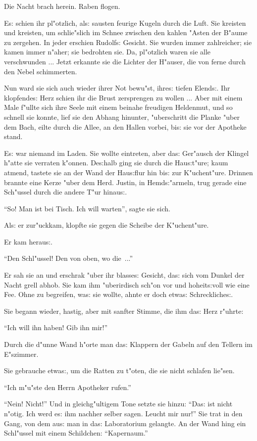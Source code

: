 \documentclass[oneside,12pt]{book}
\newcommand{\s}{s:}%
\begin{document}
Die Nacht brach herein. Raben flogen.

E{\s} schien ihr pl"otzlich, al{\s} sausten feurige Kugeln durch
die Luft. Sie kreisten und kreisten, um schlie"slich im Schnee
zwischen den kahlen "Asten der B"aume zu zergehen. In jeder
erschien Rudolf{\s} Gesicht. Sie wurden immer zahlreicher; sie
kamen immer n"aher; sie bedrohten sie. Da, pl"otzlich waren sie
alle verschwunden ... Jetzt erkannte sie die Lichter der H"auser,
die von ferne durch den Nebel schimmerten.

Nun ward sie sich auch wieder ihrer Not bewu"st, ihre{\s} tiefen
Elend{\s}. Ihr klopfende{\s} Herz schien ihr die Brust zersprengen
zu wollen ... Aber mit einem Male f"ullte sich ihre Seele mit
einem beinahe freudigen Heldenmut, und so schnell sie konnte, lief
sie den Abhang hinunter, "uberschritt die Planke "uber dem Bach,
eilte durch die Allee, an den Hallen vorbei, bi{\s} sie vor der
Apotheke stand.

E{\s} war niemand im Laden. Sie wollte eintreten, aber da{\s}
Ger"ausch der Klingel h"atte sie verraten k"onnen. De{\s}halb ging
sie durch die Hau{\s}t"ure; kaum atmend, tastete sie an der Wand
der Hau{\s}flur hin bi{\s} zur K"uchent"ure. Drinnen brannte eine
Kerze "uber dem Herd. Justin, in Hemd{\s}"armeln, trug gerade eine
Sch"ussel durch die andere T"ur hinau{\s}.

"`So! Man ist bei Tisch. Ich will warten"', sagte sie sich.

Al{\s} er zur"uckkam, klopfte sie gegen die Scheibe der
K"uchent"ure.

Er kam herau{\s}.

"`Den Schl"ussel! Den von oben, wo die~..."'

Er sah sie an und erschrak "uber ihr blasse{\s} Gesicht, da{\s}
sich vom Dunkel der Nacht grell abhob. Sie kam ihm "uberirdisch
sch"on vor und hoheit{\s}voll wie eine Fee. Ohne zu begreifen,
wa{\s} sie wollte, ahnte er doch etwa{\s} Schreckliche{\s}.

Sie begann wieder, hastig, aber mit sanfter Stimme, die ihm da{\s}
Herz r"uhrte:

"`Ich will ihn haben! Gib ihn mir!"'

Durch die d"unne Wand h"orte man da{\s} Klappern der Gabeln auf
den Tellern im E"szimmer.

Sie gebrauche etwa{\s}, um die Ratten zu t"oten, die sie nicht
schlafen lie"sen.

"`Ich m"u"ste den Herrn Apotheker rufen."'

"`Nein! Nicht!"' Und in gleichg"ultigem Tone setzte sie hinzu:
"`Da{\s} ist nicht n"otig. Ich werd e{\s} ihm nachher selber
sagen. Leucht mir nur!"' Sie trat in den Gang, von dem au{\s} man
in da{\s} Laboratorium gelangte. An der Wand hing ein Schl"ussel
mit einem Schildchen: "`Kapernaum."'
\end{document}
